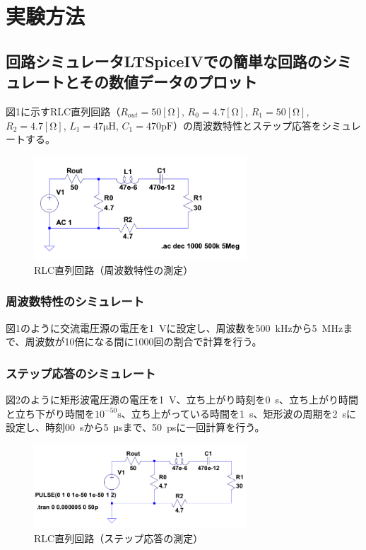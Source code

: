 \documentclass[10pt,a4j,dvipdfmx]{jsarticle}
\makeatletter
\let\@oldsec\section
\let\@oldsubsec\subsection
\renewcommand{\section}[1]{\@oldsec{#1}\vspace{-5pt}{\color{TealBlue}\hrule height 0.6pt \hfill}\par}
\renewcommand{\subsection}[1]{\vspace{-7pt}\@oldsubsec{#1}}
\makeatother
\begin{document}
\section{実験方法}
\subsection{回路シミュレータLTSpiceI\hspace{-.1em}Vでの簡単な回路のシミュレートとその数値データのプロット}
図1に示すRLC直列回路（$R_{out} = 50[\si{\ohm}]$, $R_{0} = 4.7[\si{\ohm}]$, $R_{1} = 50[\si{\ohm}]$, $R_{2} = 4.7[\si{\ohm}]$, $L_{1} = 47\si{\micro\henry}$, $C_{1} = 470\si{\pico\farad}$）の周波数特性とステップ応答をシミュレートする。

\begin{figure}[H]
  \centering
  \includegraphics[width=8cm]{1AC.png}
  \caption{RLC直列回路（周波数特性の測定）}
\end{figure}

\subsubsection{周波数特性のシミュレート}
図1のように交流電圧源の電圧を\SI{1}{\volt}に設定し、周波数を\SI{500}{\kilo\hertz}から\SI{5}{\mega\hertz}まで、周波数が10倍になる間に1000回の割合で計算を行う。

\subsubsection{ステップ応答のシミュレート}
図2のように矩形波電圧源の電圧を\SI{1}{\volt}、立ち上がり時刻を\SI{0}{\second}、立ち上がり時間と立ち下がり時間を$10^{-50}\si{\second}$、立ち上がっている時間を\SI{1}{\second}、矩形波の周期を\SI{2}{\second}に設定し、時刻\SI{00}{\second}から\SI{5}{\micro\second}まで、\SI{50}{\pico\second}に一回計算を行う。
\begin{figure}[H]
  \centering
  \includegraphics[width=8cm]{1step.png}
  \caption{RLC直列回路（ステップ応答の測定）}
\end{figure}
\end{document}
